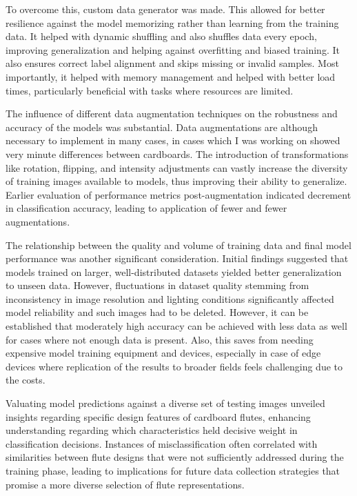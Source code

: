 To overcome this, custom data generator was made. This allowed for better resilience against the model memorizing rather than learning from the training data.  It helped with dynamic shuffling and also shuffles data every epoch, improving generalization and helping against overfitting and biased training. It also ensures correct label alignment and skips missing or invalid samples. Most importantly, it helped with memory management and helped with better load times, particularly beneficial with tasks where resources are limited.

The influence of different data augmentation techniques on the robustness and accuracy of the models was substantial. Data augmentations are although necessary to implement in many cases, in cases which I was working on showed very minute differences between cardboards. The introduction of transformations like rotation, flipping, and intensity adjustments can vastly increase the diversity of training images available to models, thus improving their ability to generalize. Earlier evaluation of performance metrics post-augmentation indicated decrement in classification accuracy, leading to application of fewer and fewer augmentations.

The relationship between the quality and volume of training data and final model performance was another significant consideration. Initial findings suggested that models trained on larger, well-distributed datasets yielded better generalization to unseen data. However, fluctuations in dataset quality stemming from inconsistency in image resolution and lighting conditions significantly affected model reliability and such images had to be deleted. However, it can be established that moderately high accuracy can be achieved with less data as well for cases where not enough data is present. Also, this saves from needing expensive model training equipment and devices, especially in case of edge devices where replication of the results to broader fields feels challenging due to the costs.

Valuating model predictions against a diverse set of testing images unveiled insights regarding specific design features of cardboard flutes, enhancing understanding regarding which characteristics held decisive weight in classification decisions. Instances of misclassification often correlated with similarities between flute designs that were not sufficiently addressed during the training phase, leading to implications for future data collection strategies that promise a more diverse selection of flute representations. 

